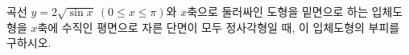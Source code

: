 곡선 $y=2\sqrt{\sin x}\ (0\le x\le\pi)$와 $x$축으로 둘러싸인 도형을 밑면으로 하는 입체도형을 $x$축에 수직인 평면으로 자른 단면이 모두 정사각형일 때, 이 입체도형의 부피를 구하시오.
